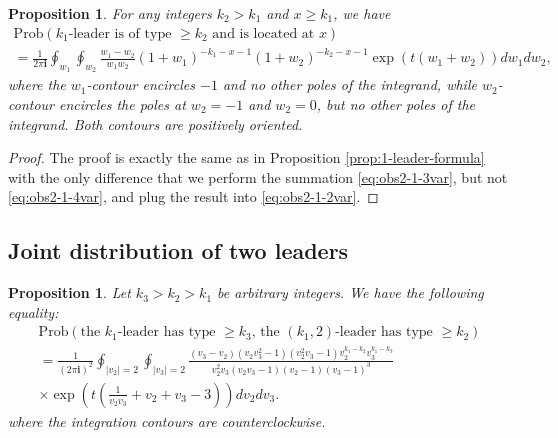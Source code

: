 \documentclass[11pt,reqno]{amsart}
\newtheorem{prop}[thm]{Proposition}
\theoremstyle{definition}
\theoremstyle{remark}
\theoremstyle{remark}
\def\geq{\geqslant}
\renewcommand\ge{\geq}
\newcommand{\ii}{{\mathbf i}}
\numberwithin{equation}{section}
\begin{document}
	\begin{prop}
		\label{prop:leader-position}
		For any integers $k_2 > k_1$ and $x \ge k_1$, we have
		\begin{multline}
			\label{eq:LeaderAsymp1v2}
			\mathrm{Prob} \left( \mbox{$k_1$-leader is of type $\ge k_2$ and is located at $x$} \right) \\ = \frac{1}{2 \pi \ii} \oint_{w_1} \oint_{w_2}
			\frac{w_1-w_2}{w_1 w_2} (1+w_1)^{-k_1-x-1} (1+w_2)^{-k_2-x-1} \exp \left( t (w_1 +w_2) \right) dw_1 dw_2,
		\end{multline}
		where the $w_1$-contour encircles $-1$ and no other poles of the integrand, while $w_2$-contour encircles the poles at $w_2=-1$ and $w_2=0$, but no other poles of the integrand. Both contours are positively oriented.
	\end{prop}
	
	\begin{proof}
		
		The proof is exactly the same as in Proposition \ref{prop:1-leader-formula} with the only difference that we perform the summation \eqref{eq:obs2-1-3var}, but not \eqref{eq:obs2-1-4var}, and plug the result into \eqref{eq:obs2-1-2var}.
		
	\end{proof}
	
	\subsection{Joint distribution of two leaders}
	
	\begin{prop}
		\label{prop:2leaders-1}
		Let $k_3 >k_2 > k_1$ be arbitrary integers. We have the following equality:
		\begin{multline}
			\label{eq:prop2leaders1}
			\mathrm{Prob} \left( \mbox{the $k_1$-leader has type $\ge k_3$, } \mbox{the $(k_1, 2)$-leader has type $\ge k_2$} \right)
			\\ =
			\frac{1}{(2 \pi \ii)^2} \oint_{|v_2|=2} \oint_{|v_3|=2} \frac{(v_3-v_2)(v_2 v_3^2-1)(v_2^2 v_3-1) v_2^{k_1-k_2} v_3^{k_1-k_3}}{ v_2^2 v_3 (v_2 v_3-1) (v_2-1) (v_3-1)^3 } \\ \times \exp \left( t \left( \frac{1}{v_2 v_3} + v_2 + v_3 - 3 \right) \right) d v_2 d v_3.
		\end{multline}
		where the integration contours are counterclockwise.
	\end{prop}
	
\end{document}
